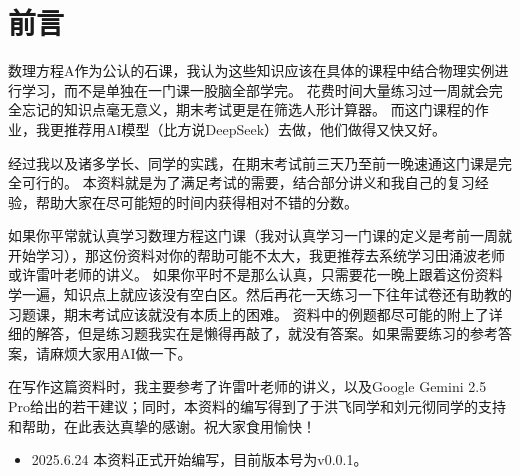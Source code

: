 \chapter*{前言}
数理方程A作为公认的石课，我认为这些知识应该在具体的课程中结合物理实例进行学习，而不是单独在一门课一股脑全部学完。
花费时间大量练习过一周就会完全忘记的知识点毫无意义，期末考试更是在筛选人形计算器。
而这门课程的作业，我更推荐用AI模型（比方说DeepSeek）去做，他们做得又快又好。

经过我以及诸多学长、同学的实践，在期末考试前三天乃至前一晚速通这门课是完全可行的。
本资料就是为了满足考试的需要，结合部分讲义和我自己的复习经验，帮助大家在尽可能短的时间内获得相对不错的分数。

如果你平常就认真学习数理方程这门课（我对认真学习一门课的定义是考前一周就开始学习），那这份资料对你的帮助可能不太大，我更推荐去系统学习田涌波老师或许雷叶老师的讲义。
如果你平时不是那么认真，只需要花一晚上跟着这份资料学一遍，知识点上就应该没有空白区。然后再花一天练习一下往年试卷还有助教的习题课，期末考试应该就没有本质上的困难。
资料中的例题都尽可能的附上了详细的解答，但是练习题我实在是懒得再敲了，就没有答案。如果需要练习的参考答案，请麻烦大家用AI做一下。

在写作这篇资料时，我主要参考了许雷叶老师的讲义，以及Google Gemini 2.5 Pro给出的若干建议；同时，本资料的编写得到了于洪飞同学和刘元彻同学的支持和帮助，在此表达真挚的感谢。祝大家食用愉快！

\begin{itemize}
    \item 2025.6.24 本资料正式开始编写，目前版本号为v0.0.1。
\end{itemize}